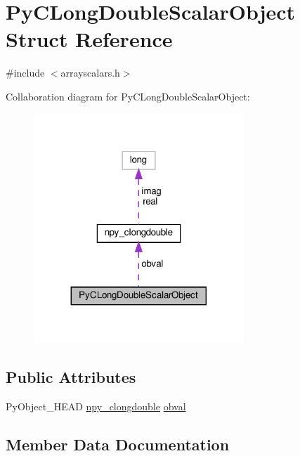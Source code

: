 \hypertarget{structPyCLongDoubleScalarObject}{}\section{Py\+C\+Long\+Double\+Scalar\+Object Struct Reference}
\label{structPyCLongDoubleScalarObject}


{\ttfamily \#include $<$arrayscalars.\+h$>$}



Collaboration diagram for Py\+C\+Long\+Double\+Scalar\+Object\+:
\nopagebreak
\begin{figure}[H]
\begin{center}
\leavevmode
\includegraphics[width=224pt]{structPyCLongDoubleScalarObject__coll__graph}
\end{center}
\end{figure}
\subsection*{Public Attributes}
\begin{DoxyCompactItemize}
\item 
Py\+Object\+\_\+\+H\+E\+AD \hyperlink{structnpy__clongdouble}{npy\+\_\+clongdouble} \hyperlink{structPyCLongDoubleScalarObject_a91bc86b790e256fc93c1dcfb241fbf43}{obval}
\end{DoxyCompactItemize}


\subsection{Member Data Documentation}
\mbox{\label{structPyCLongDoubleScalarObject_a91bc86b790e256fc93c1dcfb241fbf43}} 
